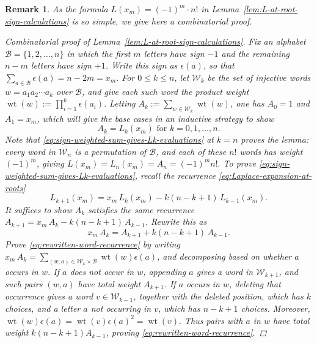 \documentclass[10pt]{amsart}
\theoremstyle{plain}
\newtheorem{remark}[conjecture]{Remark}
\begin{document}
\begin{remark} \rm
\label{rem:combinatorial-proof-of-lemma}
As the formula \(L(x_m)=(-1)^m\cdot n!\) in
Lemma~\ref{lem:L-at-root-sign-calculations} is so simple, we give here
a combinatorial proof.

\begin{proof}[Combinatorial proof of Lemma~\ref{lem:L-at-root-sign-calculations}]
Fix an alphabet $\mathcal B=\{1,2,\ldots,n\}$ in which the first $m$
letters have sign $-1$ and the remaining $n-m$ letters have sign $+1$.
Write this sign as $\epsilon(a)$, so that
$\sum_{a\in\mathcal B}\epsilon(a)=n-2m=x_m.$
For $0\leq k\leq n$, let $\mathcal W_k$ be the set of injective words
$w=a_1a_2\cdots a_k$ over $\mathcal B$, and give each such word the product weight
$
 \operatorname{wt}(w):=\prod_{i=1}^k\epsilon(a_i).
$
Letting  $A_k:=\sum_{w\in\mathcal W_k}\operatorname{wt}(w)$,
one has
$A_0=1$ and $A_1=x_m$, which 
will give the base cases in an inductive strategy to show 
\begin{equation}
\label{eq:sign-weighted-sum-gives-Lk-evaluations}
A_k=L_k(x_m) \text{ for }k=0,1,\ldots,n.
\end{equation}
Note that \eqref{eq:sign-weighted-sum-gives-Lk-evaluations} at $k=n$ proves the lemma: every word in $\mathcal W_n$ is a permutation of
$\mathcal B$, and each of these
$n!$ words has weight
$(-1)^m$, giving
$
 L(x_m)=L_n(x_m)=A_n=(-1)^m n!.
$
To prove \eqref{eq:sign-weighted-sum-gives-Lk-evaluations},
recall the recurrence \eqref{eq:Laplace-expansion-at-roots} 
\[
 L_{k+1}(x_m)
 =x_m \, L_k(x_m)-k(n-k+1) \, L_{k-1}(x_m).
\]
It suffices to show $A_k$ satisfies the same
recurrence
$A_{k+1}=x_m\, A_k-k(n-k+1) \, A_{k-1}$. Rewrite this as
\begin{equation}
\label{eq:rewritten-word-recurrence}
 x_m\, A_k=A_{k+1}+k(n-k+1) \, A_{k-1}.
\end{equation} 
Prove \eqref{eq:rewritten-word-recurrence} by writing $x_m\, A_k=\sum_{(w,a) \in \mathcal W_k \times \mathcal B} \operatorname{wt}(w)\epsilon(a)$, and decomposing based on whether $a$ occurs in $w$.
If $a$ does
not occur in $w$, appending $a$ gives a word in ${\mathcal W}_{k+1}$, and such pairs $(w,a)$ have total weight $A_{k+1}$.  
If $a$ occurs
in $w$, deleting that occurrence gives a word
$v\in\mathcal W_{k-1}$, together with the deleted position, which has
$k$ choices, and a letter $a$ not occurring in $v$, which has
$n-k+1$ choices.  Moreover,
$
 \operatorname{wt}(w)\epsilon(a)
 =\operatorname{wt}(v)\epsilon(a)^2
 =\operatorname{wt}(v).
$
Thus pairs with $a$ in $w$ have total weight $k(n-k+1)A_{k-1}$, proving \eqref{eq:rewritten-word-recurrence}.
\end{proof}
\end{remark}
\end{document}
